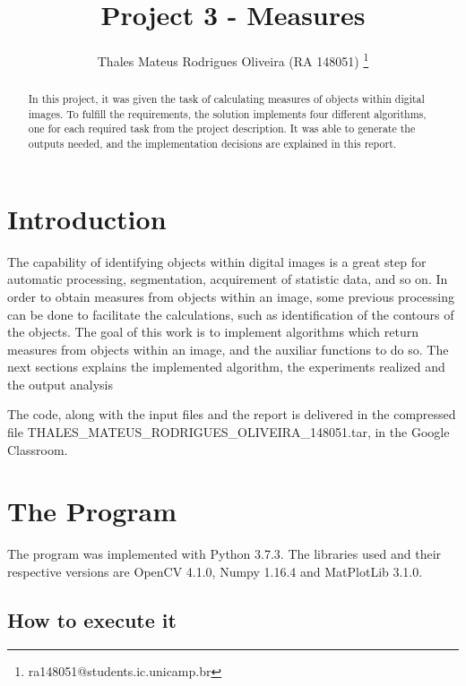 \documentclass[]{IEEEtran}
\begin{document}
  \title{Project 3 - Measures}
  \author{Thales Mateus Rodrigues Oliveira (RA 148051)
    \thanks{ra148051@students.ic.unicamp.br}
  }
  \maketitle
  
  \begin{abstract}
    In this project, it was given the task of calculating measures of objects within digital images. To fulfill the requirements, the solution implements four different algorithms, one for each required task from the project description\cite{PROJECT:3}. It was able to generate the outputs needed, and the implementation decisions are explained in this report.
  \end{abstract}
  
\section{Introduction}
The capability of identifying objects within digital images is a great step for automatic processing, segmentation, acquirement of statistic data, and so on. In order to obtain measures from objects within an image, some previous processing can be done to facilitate the calculations, such as identification of the contours of the objects. The goal of this work is to implement algorithms which return measures from objects within an image, and the auxiliar functions to do so. The next sections explains the implemented algorithm, the experiments realized and the output analysis
\par The code, along with the input files and the report is delivered in the compressed file THALES\_MATEUS\_RODRIGUES\_OLIVEIRA\_148051.tar, in the Google Classroom.

\section{The Program}
 
The program was implemented with Python 3.7.3. The libraries used and their respective versions are OpenCV 4.1.0, Numpy 1.16.4 and MatPlotLib 3.1.0.

\subsection{How to execute it}
\end{document}
